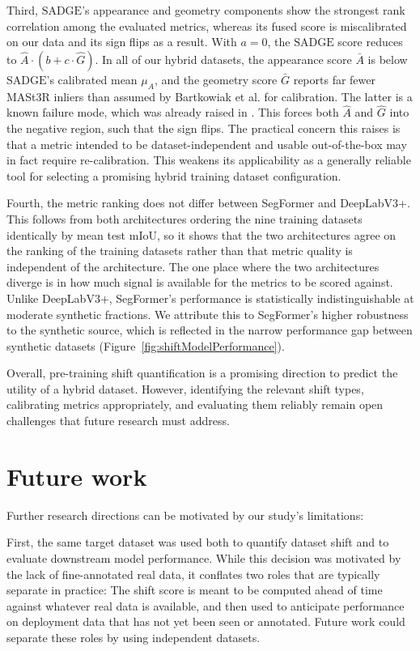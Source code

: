 \documentclass[conference]{IEEEtran}
\begin{document}
Third, $\text{SADGE}$'s appearance and geometry components show the strongest rank correlation among the evaluated metrics, whereas its fused score is miscalibrated on our data and its sign flips as a result. With $a=0$, the $\text{SADGE}$ score reduces to $\hat{A} \cdot(b + c \cdot \hat{G})$. In all of our hybrid datasets, the appearance score $\bar{A}$ is below $\text{SADGE}$'s calibrated mean $\mu_A$, and the geometry score $\bar{G}$ reports far fewer MASt3R inliers than assumed by Bartkowiak et al. \cite{bartkowiak2026} for calibration. The latter is a known failure mode, which was already raised in \cite{bartkowiak2026}. This forces both $\hat{A}$ and $\hat{G}$ into the negative region, such that the sign flips. The practical concern this raises is that a metric intended to be dataset-independent and usable out-of-the-box may in fact require re-calibration. This weakens its applicability as a generally reliable tool for selecting a promising hybrid training dataset configuration.

Fourth, the metric ranking does not differ between SegFormer and DeepLabV3+. This follows from both architectures ordering the nine training datasets identically by mean test mIoU, so it shows that the two architectures agree on the ranking of the training datasets rather than that metric quality is independent of the architecture. The one place where the two architectures diverge is in how much signal is available for the metrics to be scored against. Unlike DeepLabV3+, SegFormer's performance is statistically indistinguishable at moderate synthetic fractions. We attribute this to SegFormer's higher robustness to the synthetic source, which is reflected in the narrow performance gap between synthetic datasets (Figure~\ref{fig:shiftModelPerformance}).

Overall, pre-training shift quantification is a promising direction to predict the utility of a hybrid dataset. However, identifying the relevant shift types, calibrating metrics appropriately, and evaluating them reliably remain open challenges that future research must address.

\section{Future work}
Further research directions can be motivated by our study's limitations: 

First, the same target dataset was used both to quantify dataset shift and to evaluate downstream model performance. While this decision was motivated by the lack of fine-annotated real data, it conflates two roles that are typically separate in practice: The shift score is meant to be computed ahead of time against whatever real data is available, and then used to anticipate performance on deployment data that has not yet been seen or annotated. Future work could separate these roles by using independent datasets.
\end{document}
